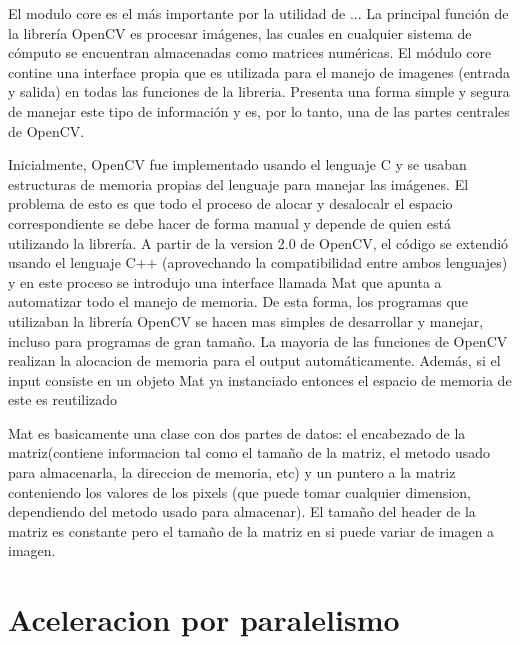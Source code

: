 \documentclass[a4paper,10pt]{report}
\begin{document}
El modulo core es el más importante por la utilidad de ...
La principal función de la librería OpenCV es procesar imágenes, las cuales en cualquier sistema de cómputo se encuentran almacenadas como matrices numéricas. 
El módulo core contine una interface propia que es utilizada para el manejo de imagenes (entrada y salida) en todas las funciones de la libreria. 
Presenta una forma simple y segura de manejar este tipo de información y es, por lo tanto, una de las partes centrales de OpenCV.

Inicialmente, OpenCV fue implementado usando el lenguaje C y se usaban estructuras de memoria propias del lenguaje para manejar las imágenes. 
El problema de esto es que todo el proceso de alocar y desalocalr el espacio correspondiente se debe hacer de forma manual y depende de quien está utilizando la librería. 
A partir de la version 2.0 de OpenCV, el código se extendió usando el lenguaje C++ (aprovechando la compatibilidad entre ambos lenguajes) y en este proceso se introdujo una interface llamada Mat que apunta a automatizar todo el manejo de memoria. 
De esta forma, los programas que utilizaban la librería OpenCV se hacen mas simples de desarrollar y manejar, incluso para programas de gran tamaño.
La mayoria de las funciones de OpenCV realizan la alocacion de memoria para el output automáticamente. 
Además, si el input consiste en un objeto Mat ya instanciado entonces el espacio de memoria de este es reutilizado

Mat es basicamente una clase con dos partes de datos: el encabezado de la matriz(contiene informacion tal como el tamaño de la matriz, el metodo usado para almacenarla, la direccion de memoria, etc) y un puntero a la matriz conteniendo los valores de los pixels (que puede tomar cualquier dimension, dependiendo del metodo usado para almacenar).
El tamaño del header de la matriz es constante pero el tamaño de la matriz en si puede variar de imagen a imagen.





\section{Aceleracion por paralelismo}


\end{document}

